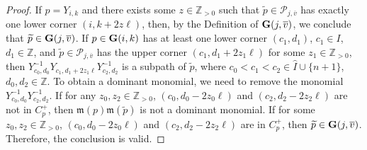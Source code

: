 \documentclass[12pt, reqno]{amsart}
\numberwithin{equation}{section}
\newcommand{\ZZ}{\mathbb{Z}}
\begin{document}
{\begin{proof}
If $p=Y_{i,k}$ and there exists some $z\in \ZZ_{>0}$ such that $\widetilde{p}\in \mathscr{P}_{j, \overline{v}}$ has exactly one lower corner $(i,k+2z \ell)$, then, by the Definition of ${\bf G}(j,\overline{v})$, we conclude that $\widetilde{p}\in {\bf G}(j,\overline{v})$. If $p \in {\bf G}(i,k)$ has at least one lower corner $(c_1,d_1)$, $c_1\in I$, $d_1\in \ZZ$, and $\widetilde{p}\in \mathscr{P}_{j, \overline{v}}$ has the upper corner $(c_1,d_1+2z_1 \ell)$ for some $z_1 \in \ZZ_{>0}$, then $Y_{c_0, d_0}^{-1}Y_{c_1,d_1+2z_1 \ell}Y_{c_2,d_2}^{-1}$ is a subpath of $\widetilde{p}$, where $c_0<c_1<c_2 \in \hat{I}\cup \{n+1\}$, $d_0,d_2\in \ZZ$. To obtain a dominant monomial, we need to remove the monomial $Y_{c_0, d_0}^{-1}Y_{c_2,d_2}^{-1}$. If for any $z_0,z_2 \in \ZZ_{>0}$, $(c_0, d_0-2z_0 \ell)$ and $(c_2,d_2-2z_2 \ell)$ are not in $C^{+}_{p}$, then $\mathfrak{m}(p)\mathfrak{m}(\widetilde{p})$ is not a dominant monomial. If for some $z_0,z_2 \in \ZZ_{>0}$, $(c_0, d_0-2z_0 \ell)$ and $(c_2,d_2-2z_2 \ell)$ are in $C^{+}_{p}$, then $\widetilde{p}\in {\bf G}(j,\overline{v})$. Therefore, the conclusion is valid.



\end{proof}}
\end{document}
